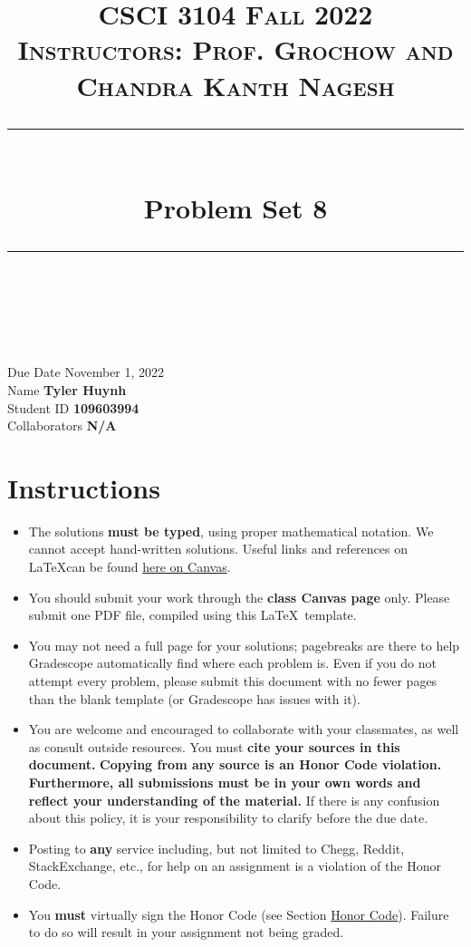 \documentclass[11pt]{article}
\title{
\normalfont \normalsize 
\textsc{CSCI 3104 Fall 2022 \\ 
Instructors: Prof. Grochow and Chandra Kanth Nagesh} \\
[10pt] 
\rule{\linewidth}{0.5pt} \\[6pt] 
\huge Problem Set 8 \\
\rule{\linewidth}{2pt}  \\[10pt]
}
\date{}
\theoremstyle{definition}
\theoremstyle{definition}
\theoremstyle{definition}
\begin{document}

\maketitle


\noindent
Due Date \dotfill November 1, 2022 \\
Name \dotfill \textbf{Tyler Huynh} \\
Student ID \dotfill \textbf{109603994} \\
Collaborators \dotfill \textbf{N/A}

\tableofcontents

\section*{Instructions}
 \begin{itemize}
	\item The solutions \textbf{must be typed}, using proper mathematical notation. We cannot accept hand-written solutions. Useful links and references on \LaTeX can be found \href{https://canvas.colorado.edu/courses/75824/pages/latex}{here on Canvas}.
	\item You should submit your work through the \textbf{class Canvas page} only. Please submit one PDF file, compiled using this \LaTeX \ template.
	\item You may not need a full page for your solutions; pagebreaks are there to help Gradescope automatically find where each problem is. Even if you do not attempt every problem, please submit this document with no fewer pages than the blank template (or Gradescope has issues with it).

	\item You are welcome and encouraged to collaborate with your classmates, as well as consult outside resources. You must \textbf{cite your sources in this document.} \textbf{Copying from any source is an Honor Code violation. Furthermore, all submissions must be in your own words and reflect your understanding of the material.} If there is any confusion about this policy, it is your responsibility to clarify before the due date. 

	\item Posting to \textbf{any} service including, but not limited to Chegg, Reddit, StackExchange, etc., for help on an assignment is a violation of the Honor Code.

	\item You \textbf{must} virtually sign the Honor Code (see Section \hyperlink{HonorCode}{Honor Code}). Failure to do so will result in your assignment not being graded.
\end{itemize}
\end{document}
